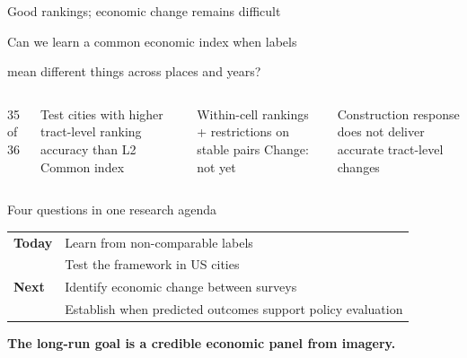 \documentclass[11pt,aspectratio=169]{beamer}
\newcommand{\takeaway}[1]{\par{\color{mgAccent}\normalsize\bfseries #1\par}}
\begin{document}
\begin{frame}[label=s2]{Good rankings; economic change remains difficult}

\large Can we learn a common economic index when labels\par
mean different things across places and years?
\par\vspace{.7cm}
\begin{columns}[T]
\textcolor{mgAccent}{\Large 35 of 36}\par\medskip
Test cities with higher tract-level ranking accuracy than L2
\textcolor{mgAccent}{\Large Common index}\par\medskip
Within-cell rankings + restrictions on stable pairs
\textcolor{mgRed}{\Large Change: not yet}\par\medskip
Construction response does not deliver accurate tract-level changes
\end{columns}

\end{frame}

\begin{frame}[label=s3]{Four questions in one research agenda}

\begin{tabularx}{\textwidth}{@{}l X@{}}
\textcolor{mgAccent}{\textbf{Today}} & Learn from non-comparable labels\\[.5cm]
 & Test the framework in US cities\\[.6cm]
\textcolor{mgMuted}{\textbf{Next}} & Identify economic change between surveys\\[.5cm]
 & Establish when predicted outcomes support policy evaluation
\end{tabularx}
\par\vfill
\takeaway{The long-run goal is a credible economic panel from imagery.}

\end{frame}
\end{document}
